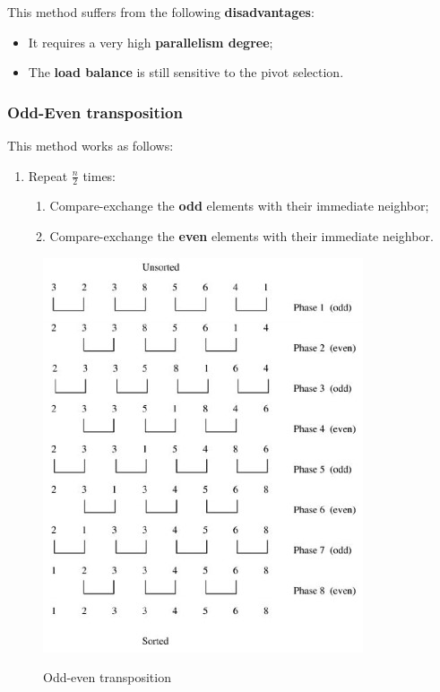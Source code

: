 This method suffers from the following \textbf{disadvantages}:

\begin{itemize}
    \item It requires a very high \textbf{parallelism degree};
    \item The \textbf{load balance} is still sensitive to the pivot selection.
\end{itemize}

\subsubsection{Odd-Even transposition}
This method works as follows:

\begin{enumerate}
    \item Repeat $\frac{n}{2}$ times:

    \begin{enumerate}
        \item Compare-exchange the \textbf{odd} elements with their immediate neighbor;
        \item Compare-exchange the \textbf{even} elements with their immediate neighbor.
    \end{enumerate}
\end{enumerate}

\begin{figure}[h!]
		\centering
		\includegraphics[scale = 2.0]{img/odd-even transposition.jpg}
        \label{odd-even}
        \caption{Odd-even transposition}
\end{figure}

